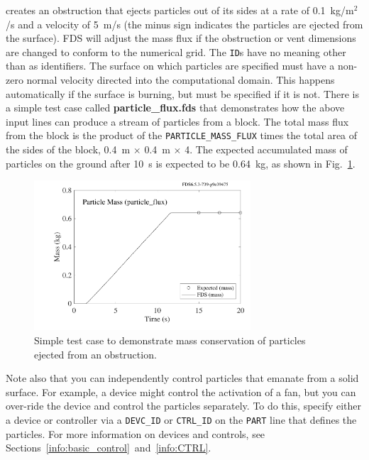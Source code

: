 \documentclass[11pt]{book}
\newcommand{\ct}{\tt\small}
\begin{document}
\noindent
creates an obstruction that ejects particles out of its sides at a rate
of 0.1~kg/m$^2$/s and a velocity of 5~m/s (the minus sign indicates the particles are ejected from the surface).
FDS will adjust the mass flux if the obstruction or vent dimensions are changed to conform to the numerical grid. The
{\ct ID}s have no meaning other than as identifiers. The surface on which particles are specified must have a non-zero normal velocity directed into the
computational domain. This happens automatically if the surface is burning, but must be specified
if it is not. There is a simple test case called {\bf particle\_flux.fds} that demonstrates how the above input lines can produce a stream of
particles from a block. The total mass flux from the block is the product of the {\ct PARTICLE\_MASS\_FLUX} times the total area of the sides of the block,
0.4~m $\times$ 0.4~m $\times$ 4. The expected accumulated mass of particles on the ground after 10~s is expected to be 0.64~kg, as shown in Fig.~\ref{particle_flux}.

\begin{figure}[ht]
\begin{center}
\includegraphics[height=2.2in]{SCRIPT_FIGURES/particle_flux}
\end{center}
\caption[Simple test of particle mass flux.]{Simple test case to demonstrate mass conservation of particles ejected from an obstruction.}
\label{particle_flux}
\end{figure}

Note also that you can independently control particles that emanate from a solid surface. For example, a device might control the
activation of a fan, but you can over-ride the device and control the particles separately. To do this, specify either
a device or controller via a {\ct DEVC\_ID} or {\ct CTRL\_ID} on the {\ct PART} line that defines the particles. For more
information on devices and controls, see Sections~\ref{info:basic_control}~and~\ref{info:CTRL}.
\end{document}

